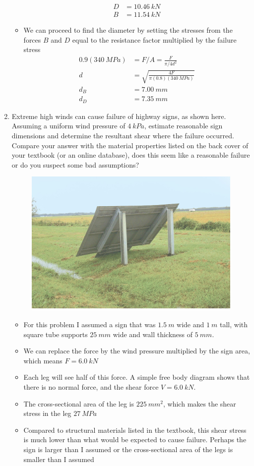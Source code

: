 \documentclass[12pt, oneside]{article}
\begin{document}
\begin{enumerate}
\begin{itemize}
\begin{align*}
			D &= \SI{10.46}{kN}\\
			B &= \SI{11.54}{kN}
		\end{align*}
	\item We can proceed to find the diameter by setting the stresses from the forces $B$ and $D$ equal to the resistance factor multiplied by the failure stress
		\begin{align*}
			0.9(\SI{340}{MPa}) &= F/A = \frac{F}{\pi/4 d^2}\\
			d &= \sqrt{\frac{4F}{\pi (0.8)(\SI{340}{MPa})}}\\
			d_B &= \SI{7.00}{mm}\\
			d_D &= \SI{7.35}{mm}
		\end{align*}
		\end{itemize}

	\item %
		Extreme high winds can cause failure of highway signs, as shown here.
		Assuming a uniform wind pressure of $\SI{4}{kPa}$, estimate reasonable sign dimensions and determine the resultant shear where the failure occurred.
		Compare your answer with the material properties listed on the back cover of your textbook (or an online database), does this seem like a reasonable failure or do you suspect some bad assumptions?
		\begin{figure}[H]
			\centering
			\includegraphics[width=0.6\linewidth]{sign}
			\label{fig:sign}
		\end{figure}
		\begin{itemize}
			\item For this problem I assumed a sign that was $\SI{1.5}{m}$ wide and $\SI{1}{m}$ tall, with square tube supports $\SI{25}{mm}$ wide and wall thickness of $\SI{5}{mm}$.
			\item We can replace the force by the wind pressure multiplied by the sign area, which means $F=\SI{6.0}{kN}$
			\item Each leg will see half of this force. A simple free body diagram shows that there is no normal force, and the shear force $V=\SI{6.0}{kN}$.
			\item The cross-sectional area of the leg is $\SI{225}{mm^2}$, which makes the shear stress in the leg $\SI{27}{MPa}$
			\item Compared to structural materials listed in the textbook, this shear stress is much lower than what would be expected to cause failure. Perhaps the sign is larger than I assumed or the cross-sectional area of the legs is smaller than I assumed
		\end{itemize}


\end{enumerate}
\end{document}
